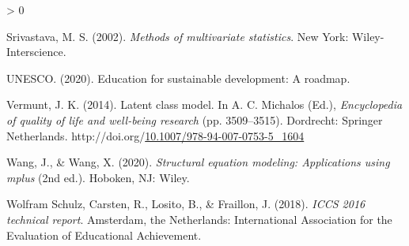 \documentclass[12pt,a4paper,oneside]{reedthesis}
\newlength{\cslhangindent}
\newenvironment{CSLReferences}[2] %
 {%
  \setlength{\parindent}{0pt}
  \ifodd #1 \everypar{\setlength{\hangindent}{\cslhangindent}}\ignorespaces\fi
  \ifnum #2 > 0
  \setlength{\parskip}{#2\baselineskip}
  \fi
 }%
 {}
\begin{document}
\begin{CSLReferences}{1}{0}
\leavevmode\hypertarget{ref-srivastava_methods_2002}{}%
Srivastava, M. S. (2002). \emph{Methods of multivariate statistics}. New York: Wiley-Interscience.

\leavevmode\hypertarget{ref-unesco_education_2020}{}%
UNESCO. (2020). Education for sustainable development: A roadmap.

\leavevmode\hypertarget{ref-michalos_latent_2014}{}%
Vermunt, J. K. (2014). Latent class model. In A. C. Michalos (Ed.), \emph{Encyclopedia of quality of life and well-being research} (pp. 3509--3515). Dordrecht: Springer Netherlands. http://doi.org/\href{https://doi.org/10.1007/978-94-007-0753-5_1604}{10.1007/978-94-007-0753-5\_1604}

\leavevmode\hypertarget{ref-wang_structural_2020}{}%
Wang, J., \& Wang, X. (2020). \emph{Structural equation modeling: Applications using mplus} (2nd ed.). Hoboken, {NJ}: Wiley.

\leavevmode\hypertarget{ref-wolfram_schulz_iccs_2018}{}%
Wolfram Schulz, Carsten, R., Losito, B., \& Fraillon, J. (2018). \emph{{ICCS} 2016 technical report}. Amsterdam, the Netherlands: International Association for the Evaluation of Educational Achievement.

\end{CSLReferences}

\end{document}
